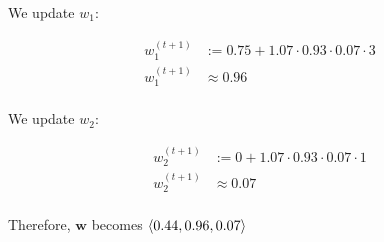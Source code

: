 We update $w_1$:

\begin{align*}
w_1^{(t+1)} &:= 0.75 +  1.07 \cdot 0.93 \cdot 0.07 \cdot 3 \\
w_1^{(t+1)} &\approx 0.96 \\
\end{align*}

We update $w_2$:

\begin{align*}
w_2^{(t+1)} &:= 0 +  1.07 \cdot 0.93 \cdot 0.07 \cdot 1 \\
w_2^{(t+1)} &\approx 0.07 \\
\end{align*}

Therefore, $\mathbf{w}$ becomes $\left\langle 0.44,0.96,0.07 \right\rangle$

\noindent{}